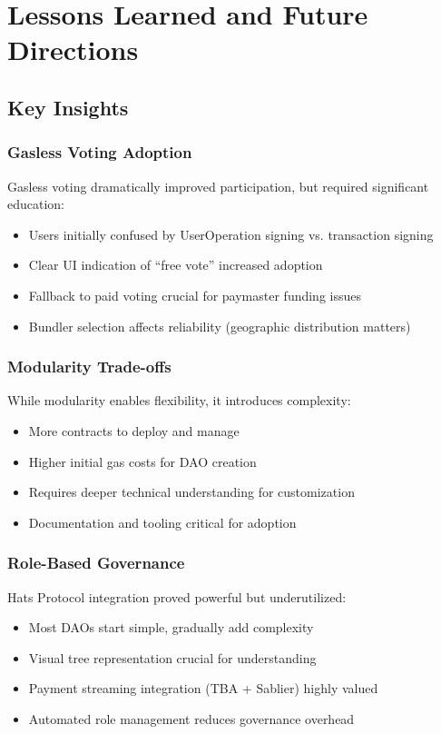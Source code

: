 \section{Lessons Learned and Future Directions}


\subsection{Key Insights}

\subsubsection{Gasless Voting Adoption}

Gasless voting dramatically improved participation, but required significant education:
\begin{itemize}
    \item Users initially confused by UserOperation signing vs. transaction signing
    \item Clear UI indication of ``free vote'' increased adoption
    \item Fallback to paid voting crucial for paymaster funding issues
    \item Bundler selection affects reliability (geographic distribution matters)
\end{itemize}

\subsubsection{Modularity Trade-offs}

While modularity enables flexibility, it introduces complexity:
\begin{itemize}
    \item More contracts to deploy and manage
    \item Higher initial gas costs for DAO creation
    \item Requires deeper technical understanding for customization
    \item Documentation and tooling critical for adoption
\end{itemize}

\subsubsection{Role-Based Governance}

Hats Protocol integration proved powerful but underutilized:
\begin{itemize}
    \item Most DAOs start simple, gradually add complexity
    \item Visual tree representation crucial for understanding
    \item Payment streaming integration (TBA + Sablier) highly valued
    \item Automated role management reduces governance overhead
\end{itemize}

